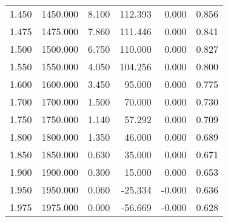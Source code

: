 \begin{tabular}{rrrrrr}
1.450 & 1450.000 & 8.100 & 112.393 & 0.000 & 0.856 \\
1.475 & 1475.000 & 7.860 & 111.446 & 0.000 & 0.841 \\
1.500 & 1500.000 & 6.750 & 110.000 & 0.000 & 0.827 \\
1.550 & 1550.000 & 4.050 & 104.256 & 0.000 & 0.800 \\
1.600 & 1600.000 & 3.450 & 95.000 & 0.000 & 0.775 \\
1.700 & 1700.000 & 1.500 & 70.000 & 0.000 & 0.730 \\
1.750 & 1750.000 & 1.140 & 57.292 & 0.000 & 0.709 \\
1.800 & 1800.000 & 1.350 & 46.000 & 0.000 & 0.689 \\
1.850 & 1850.000 & 0.630 & 35.000 & 0.000 & 0.671 \\
1.900 & 1900.000 & 0.300 & 15.000 & 0.000 & 0.653 \\
1.950 & 1950.000 & 0.060 & -25.334 & -0.000 & 0.636 \\
1.975 & 1975.000 & 0.000 & -56.669 & -0.000 & 0.628 \\
\bottomrule
\end{tabular}
